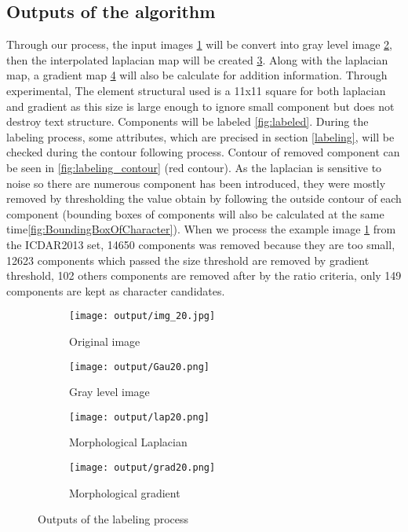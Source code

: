 \subsection*{Outputs of the algorithm}
Through our process, the input images \ref{fig:inputImage} will be convert into gray level image \ref{fig:grayScale}, then the interpolated laplacian map will be created \ref{fig:Laplacian}. Along with the laplacian map, a gradient map \ref{fig:gradient} will also be calculate for addition information. Through experimental, The element structural used is a 11x11 square for both laplacian and gradient as this size is large enough to ignore small component but does not destroy text structure. Components will be labeled \ref{fig:labeled}. During the labeling process, some attributes, which are precised in section \ref{labeling}, will be checked during the contour following process. Contour of removed component can be seen in \ref{fig:labeling_contour} (red contour). As the laplacian is sensitive to noise so there are numerous component has been introduced, they were mostly removed by thresholding the value obtain by following the outside contour of each component (bounding boxes of components will also be calculated at the same time\ref{fig:BoundingBoxOfCharacter}). When we process the example image \ref{fig:inputImage} from the ICDAR2013 set, 14650 components was removed because they are too small, 12623 components which passed the size threshold are removed by gradient threshold, 102 others components are removed after by the ratio criteria, only 149 components are kept as character candidates. 


\begin{figure}

	\begin{subfigure}[b]{0.45\textwidth}
	 	\texttt{[image: output/img\_20.jpg]} \caption{Original image}\label{fig:inputImage} \end{subfigure}
	\begin{subfigure}[b]{0.45\textwidth}
	 	\texttt{[image: output/Gau20.png]} \caption{Gray level image}\label{fig:grayScale} \end{subfigure}	 	
\centering		
		
	\begin{subfigure}[b]{0.45\textwidth}
		\texttt{[image: output/lap20.png]}  \caption{Morphological Laplacian}\label{fig:Laplacian} \end{subfigure}	
	\begin{subfigure}[b]{0.45\textwidth}
		\texttt{[image: output/grad20.png]}  \caption{Morphological gradient}\label{fig:gradient} \end{subfigure}	
\centering

	\caption[Outputs of the labeling process] {Outputs of the labeling process}
	\label{fig:output}
\end{figure}


